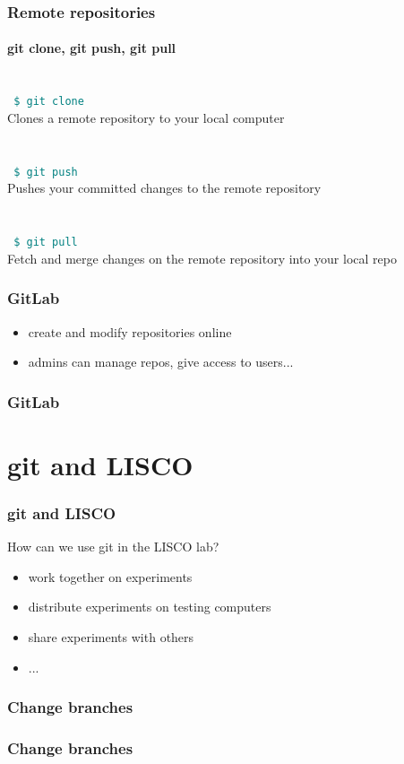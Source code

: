 \documentclass[aspectratio=169]{beamer}
\newcommand{\shellcmd}[1]{~\\ \indent\indent\texttt{\textcolor{teal}{ \$ #1}\\}}
\begin{document}

\begin{frame}
\frametitle{Remote repositories}
\framesubtitle{git clone, git push, git pull}

\shellcmd{git clone}
Clones a remote repository to your local computer
\\~\\
\shellcmd{git push}
Pushes your committed changes to the remote repository
\\~\\
\shellcmd{git pull}
Fetch and merge changes on the remote repository into your local repo
\end{frame}


\begin{frame}
\frametitle{GitLab}
\begin{itemize}
	\item create and modify repositories online
	\item admins can manage repos, give access to users...
\end{itemize}
\end{frame}


\begin{frame}
\frametitle{GitLab}
\end{frame}


\section{git and LISCO}

\begin{frame}
\frametitle{git and LISCO}
How can we use git in the LISCO lab?
\begin{itemize}
	\item work together on experiments
	\item distribute experiments on testing computers
	\item share experiments with others
	\item ...
\end{itemize}
\end{frame}


\begin{frame}
\frametitle{Change branches}
\end{frame}


\begin{frame}
\frametitle{Change branches}
\end{frame}
\end{document}
